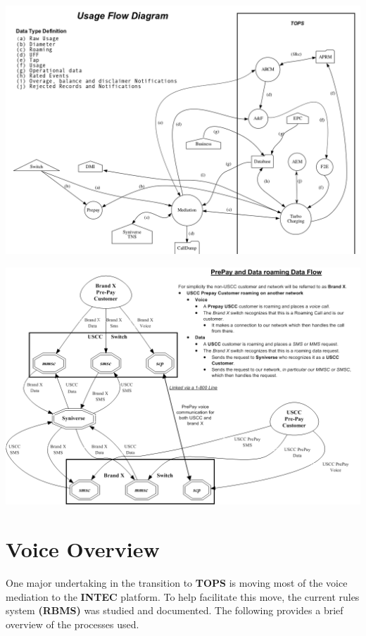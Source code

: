 \documentclass[12pt,twoside]{article}
\begin{document}
\newpage 
\begin{landscape}  
\includegraphics[width=.9\linewidth]{Pictures/uf.png}

\end{landscape} 
\newpage

\begin{landscape}  

\includegraphics[width=.9\linewidth]{Pictures/roamingPrePay.png}
\end{landscape} 
\newpage
\section{Voice Overview}
\label{sec:orgheadline12}
One major undertaking in the transition to \textbf{TOPS} is moving most of the voice mediation to the \textbf{INTEC} platform. To help facilitate this move, the current rules system \textbf{(RBMS)} was studied and documented. The following provides a brief overview of the processes used.
\end{document}
